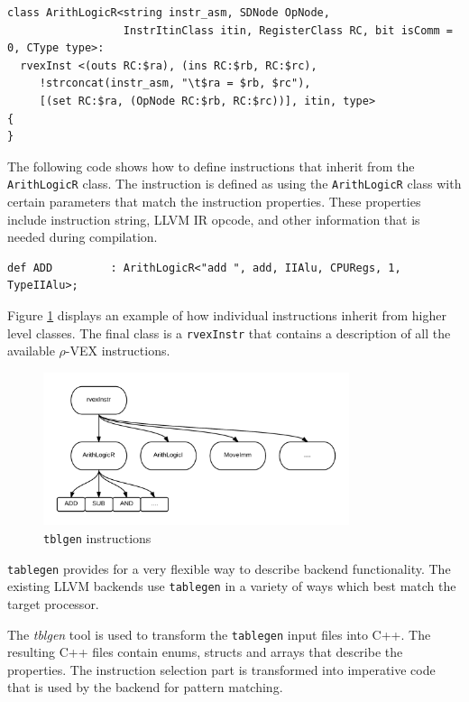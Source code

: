 \begin{lstlisting}[language=tblgen]
class ArithLogicR<string instr_asm, SDNode OpNode,
                  InstrItinClass itin, RegisterClass RC, bit isComm = 0, CType type>:
  rvexInst <(outs RC:$ra), (ins RC:$rb, RC:$rc),
     !strconcat(instr_asm, "\t$ra = $rb, $rc"),
     [(set RC:$ra, (OpNode RC:$rb, RC:$rc))], itin, type> 
{
}
\end{lstlisting}

The following code shows how to define instructions that inherit from the \texttt{ArithLogicR} class. The instruction is defined as using the \texttt{ArithLogicR} class with certain parameters that match the instruction properties. These properties include instruction string, LLVM IR opcode, and other information that is needed during compilation.

\begin{lstlisting}[language=tblgen]
def ADD         : ArithLogicR<"add ", add, IIAlu, CPURegs, 1, TypeIIAlu>;
\end{lstlisting}

Figure \ref{fig:tblgen} displays an example of how individual instructions inherit from higher level classes. The final class is a \texttt{rvexInstr} that contains a description of all the available $\rho$-VEX instructions.

\begin{figure}[ht]
\centering
\includegraphics[width=0.8\textwidth]{3_implementation/img/instr.png}
\caption{\texttt{tblgen} instructions}
\label{fig:tblgen}
\end{figure}

\texttt{tablegen} provides for a very flexible way to describe backend functionality. The existing LLVM backends use \texttt{tablegen} in a variety of ways which best match the target processor. 

The \emph{tblgen} tool is used to transform the \texttt{tablegen} input files into C++. The resulting C++ files contain enums, structs and arrays that describe the properties. The instruction selection part is transformed into imperative code that is used by the backend for pattern matching. 

